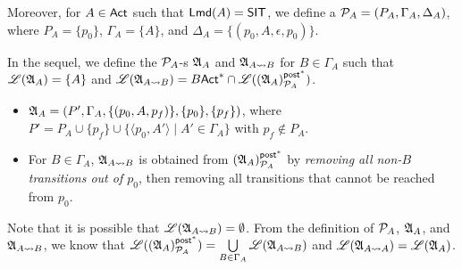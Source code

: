 Moreover, for $A \in {\sf Act}$ such that ${\sf Lmd}(A) = {\sf SIT}$, we define a {\PDS} ${\mathcal{P} }_A  = (P_A, \Gamma_A, \Delta_A)$, where $P_A = \{p_0\}$, $\Gamma_A = \{A\}$, and $\Delta_A = \{(p_0, A, \epsilon, p_0)\}$.



In the sequel, we define the ${\mathcal{P} }_{A}$-{\NFA}s ${\mathfrak{A} }_{A}$ and ${\mathfrak{A} }_{A\rightsquigarrow B}$ for $B \in \Gamma_A$ such that ${\mathscr{L} }({\mathfrak{A} }_A) = \{A\}$ and ${\mathscr{L} }({\mathfrak{A} }_{A\rightsquigarrow B}) =B{\sf Act}^* \cap {\mathscr{L} }(({\mathfrak{A} }_{A})^{{\mathsf{post} }^*}_{{\mathcal{P} }_A})$. 
\begin{itemize}
    \item ${\mathfrak{A} }_{A} = (P', \Gamma_A, \{(p_0, A, p_f)\},\{p_0\},\{p_f\} )$, where $P' = P_A \cup \{p_f\} \cup \{\langle p_0,A'\rangle \mid A'\in\Gamma_A\}$ with $p_f \not \in P_A$.  
    \item For $B \in \Gamma_A$, ${\mathfrak{A} }_{A\rightsquigarrow B}$ is obtained from $({\mathfrak{A} }_{A})^{{\mathsf{post} }^*}_{{\mathcal{P} }_A}$ by \emph{removing all non-$B$ transitions out of $p_0$}, then removing all transitions that cannot be reached from $p_0$. 
\end{itemize}
Note that it is possible that ${\mathscr{L} }({\mathfrak{A} }_{A\rightsquigarrow B}) = \emptyset$.
From the definition of ${\mathcal{P} }_A$, ${\mathfrak{A} }_A$, and ${\mathfrak{A} }_{A\rightsquigarrow B}$, we know that ${\mathscr{L} }(({\mathfrak{A} }_A)^{{\mathsf{post} }^*}_{{\mathcal{P} }_A}) = \bigcup\limits_{B\in\Gamma_A} {\mathscr{L} }({\mathfrak{A} }_{A\rightsquigarrow B})$ and ${\mathscr{L} }({\mathfrak{A} }_{A\rightsquigarrow A}) = {\mathscr{L} }({\mathfrak{A} }_A)$. 


%

